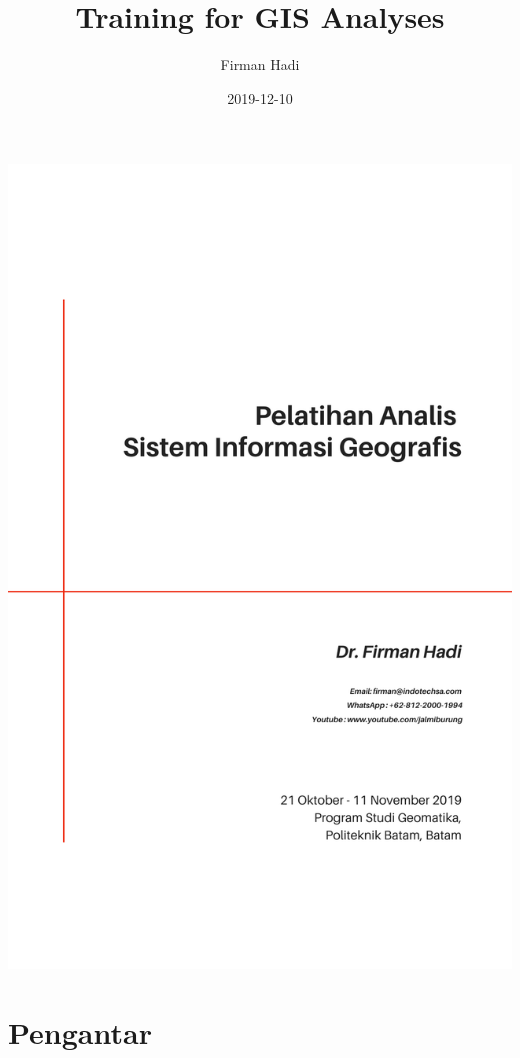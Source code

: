 \documentclass[]{book}
\title{Training for GIS Analyses}
\author{Firman Hadi}
\date{2019-12-10}
\begin{document}
\maketitle

\begin{center}
\includegraphics{cover.png}
\end{center}

{
\setcounter{tocdepth}{1}
\tableofcontents
}
\hypertarget{pengantar}{%
\chapter*{Pengantar}\label{pengantar}}
\end{document}
